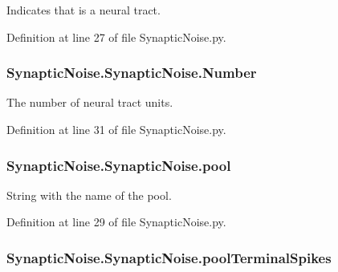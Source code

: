 Indicates that is a neural tract. 



Definition at line 27 of file Synaptic\+Noise.\+py.

\subsubsection[{\texorpdfstring{Number}{Number}}]{\setlength{\rightskip}{0pt plus 5cm}Synaptic\+Noise.\+Synaptic\+Noise.\+Number}\hypertarget{class_synaptic_noise_1_1_synaptic_noise_a9f419a5de8bbf318fac8c6c57c58bc77}{}\label{class_synaptic_noise_1_1_synaptic_noise_a9f419a5de8bbf318fac8c6c57c58bc77}


The number of neural tract units. 



Definition at line 31 of file Synaptic\+Noise.\+py.

\subsubsection[{\texorpdfstring{pool}{pool}}]{\setlength{\rightskip}{0pt plus 5cm}Synaptic\+Noise.\+Synaptic\+Noise.\+pool}\hypertarget{class_synaptic_noise_1_1_synaptic_noise_a7b3350e537e1fcadbf486e851f7f3077}{}\label{class_synaptic_noise_1_1_synaptic_noise_a7b3350e537e1fcadbf486e851f7f3077}


String with the name of the pool. 



Definition at line 29 of file Synaptic\+Noise.\+py.

\subsubsection[{\texorpdfstring{pool\+Terminal\+Spikes}{poolTerminalSpikes}}]{\setlength{\rightskip}{0pt plus 5cm}Synaptic\+Noise.\+Synaptic\+Noise.\+pool\+Terminal\+Spikes}\hypertarget{class_synaptic_noise_1_1_synaptic_noise_a4c2f941b15dc789e984620e8aa6ca5c3}{}\label{class_synaptic_noise_1_1_synaptic_noise_a4c2f941b15dc789e984620e8aa6ca5c3}


